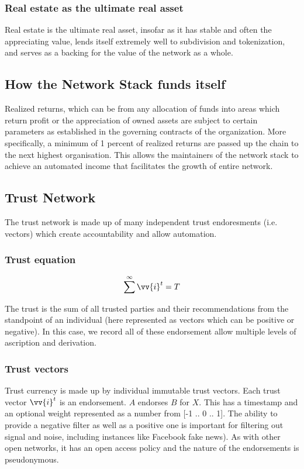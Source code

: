 \documentclass{article}
\begin{document}
\subsubsection {Real estate as the ultimate real asset}

Real estate is the ultimate real asset, insofar as it has stable and often the appreciating value, lends itself extremely well to subdivision and tokenization, and serves as a backing for the value of the network as a whole.

\subsection {How the Network Stack funds itself}

Realized returns, which can be from any allocation of funds into areas which return profit or the appreciation of owned assets are subject to certain parameters as established in the governing contracts of the organization. More specifically, a minimum of 1 percent of realized returns are passed up the chain to the next highest organisation. This allows the maintainers of the network stack to achieve an automated income that facilitates the growth of entire network.

\subsection {Trust Network}

The trust network is made up of many independent trust endoresments (i.e. vectors) which create accountability and allow automation.

\subsubsection{Trust equation}

$$\sum^{\infty} \vv{i}^t = T$$

The trust is the sum of all trusted parties and their recommendations from the standpoint of an individual (here represented as vectors which can be positive or negative). In this case, we record all of these endorsement allow multiple levels of ascription and derivation.


\subsubsection{Trust vectors}

 Trust currency is made up by individual immutable trust vectors. Each trust vector $\vv{i}^t$  is an endorsement. $A$ endorses $B$ for $X$. This has a timestamp and an optional weight represented as a number from [-1 .. 0 .. 1].  The ability to provide a negative filter as well as a positive one is important for filtering out signal and noise, including instances like Facebook fake news). As with other open networks, it has an open access policy and the nature of the endorsements is pseudonymous.
\end{document}
